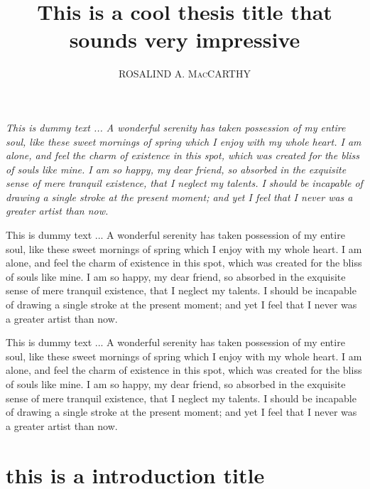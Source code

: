 \documentclass[letterpaper,oneside,12pt]{book}
\title{This is a cool thesis title that sounds very impressive}
\author{\textsc{ROSALIND A. MacCARTHY}}
\begin{document}
	\copyrightfalse
	
	\beforepreface
	
	\clearpage
	\thispagestyle{empty}
	\begin{dedication}
 		\begin{center}
 			\begin{minipage}[c]{3in}
 				\emph{%
 					This is dummy text ... A wonderful serenity has taken possession of my entire soul, like these sweet mornings of spring which I enjoy with my whole heart. I am alone, and feel the charm of existence in this spot, which was created for the bliss of souls like mine. I am so happy, my dear friend, so absorbed in the exquisite sense of mere tranquil existence, that I neglect my talents. I should be incapable of drawing a single stroke at the present moment; and yet I feel that I never was a greater artist than now.
 				}
 			\end{minipage}
 		\end{center}
	\end{dedication}
	
		This is dummy text ... A wonderful serenity has taken possession of my entire soul, like these sweet mornings of spring which I enjoy with my whole heart. I am alone, and feel the charm of existence in this spot, which was created for the bliss of souls like mine. I am so happy, my dear friend, so absorbed in the exquisite sense of mere tranquil existence, that I neglect my talents. I should be incapable of drawing a single stroke at the present moment; and yet I feel that I never was a greater artist than now.
	
 		This is dummy text ... A wonderful serenity has taken possession of my entire soul, like these sweet mornings of spring which I enjoy with my whole heart. I am alone, and feel the charm of existence in this spot, which was created for the bliss of souls like mine. I am so happy, my dear friend, so absorbed in the exquisite sense of mere tranquil existence, that I neglect my talents. I should be incapable of drawing a single stroke at the present moment; and yet I feel that I never was a greater artist than now.
	
	\afterpreface

	\chapter{this is a introduction title}\label{intro}
\end{document}
